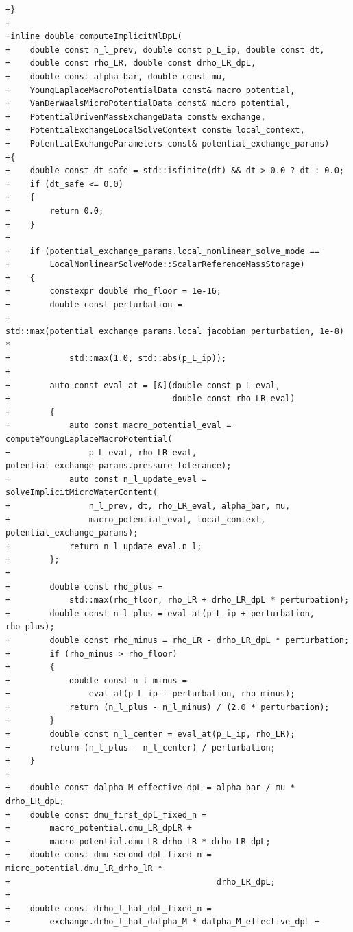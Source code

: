 \documentclass[10pt]{article}
\begin{document}
\begin{lstlisting}
+}
+
+inline double computeImplicitNlDpL(
+    double const n_l_prev, double const p_L_ip, double const dt,
+    double const rho_LR, double const drho_LR_dpL,
+    double const alpha_bar, double const mu,
+    YoungLaplaceMacroPotentialData const& macro_potential,
+    VanDerWaalsMicroPotentialData const& micro_potential,
+    PotentialDrivenMassExchangeData const& exchange,
+    PotentialExchangeLocalSolveContext const& local_context,
+    PotentialExchangeParameters const& potential_exchange_params)
+{
+    double const dt_safe = std::isfinite(dt) && dt > 0.0 ? dt : 0.0;
+    if (dt_safe <= 0.0)
+    {
+        return 0.0;
+    }
+
+    if (potential_exchange_params.local_nonlinear_solve_mode ==
+        LocalNonlinearSolveMode::ScalarReferenceMassStorage)
+    {
+        constexpr double rho_floor = 1e-16;
+        double const perturbation =
+            std::max(potential_exchange_params.local_jacobian_perturbation, 1e-8) *
+            std::max(1.0, std::abs(p_L_ip));
+
+        auto const eval_at = [&](double const p_L_eval,
+                                 double const rho_LR_eval)
+        {
+            auto const macro_potential_eval = computeYoungLaplaceMacroPotential(
+                p_L_eval, rho_LR_eval, potential_exchange_params.pressure_tolerance);
+            auto const n_l_update_eval = solveImplicitMicroWaterContent(
+                n_l_prev, dt, rho_LR_eval, alpha_bar, mu,
+                macro_potential_eval, local_context, potential_exchange_params);
+            return n_l_update_eval.n_l;
+        };
+
+        double const rho_plus =
+            std::max(rho_floor, rho_LR + drho_LR_dpL * perturbation);
+        double const n_l_plus = eval_at(p_L_ip + perturbation, rho_plus);
+        double const rho_minus = rho_LR - drho_LR_dpL * perturbation;
+        if (rho_minus > rho_floor)
+        {
+            double const n_l_minus =
+                eval_at(p_L_ip - perturbation, rho_minus);
+            return (n_l_plus - n_l_minus) / (2.0 * perturbation);
+        }
+        double const n_l_center = eval_at(p_L_ip, rho_LR);
+        return (n_l_plus - n_l_center) / perturbation;
+    }
+
+    double const dalpha_M_effective_dpL = alpha_bar / mu * drho_LR_dpL;
+    double const dmu_first_dpL_fixed_n =
+        macro_potential.dmu_LR_dpLR +
+        macro_potential.dmu_LR_drho_LR * drho_LR_dpL;
+    double const dmu_second_dpL_fixed_n = micro_potential.dmu_lR_drho_lR *
+                                          drho_LR_dpL;
+
+    double const drho_l_hat_dpL_fixed_n =
+        exchange.drho_l_hat_dalpha_M * dalpha_M_effective_dpL +

\end{lstlisting}
\end{document}
